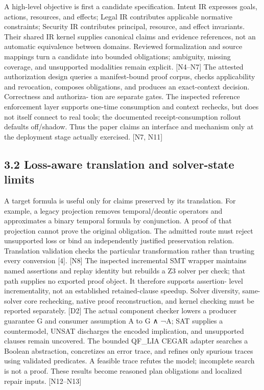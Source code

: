 A high-level objective is first a candidate specification. Intent IR expresses goals, actions, resources,
and effects; Legal IR contributes applicable normative constraints; Security IR contributes principal,
resource, and effect invariants. Their shared IR kernel supplies canonical claims and evidence
references, not an automatic equivalence between domains. Reviewed formalization and source
mappings turn a candidate into bounded obligations; ambiguity, missing coverage, and unsupported
modalities remain explicit. [N4–N7]
The attested authorization design queries a manifest-bound proof corpus, checks applicability and
revocation, composes obligations, and produces an exact-context decision. Correctness and authoriza-
tion are separate gates. The inspected reference enforcement layer supports one-time consumption
and context rechecks, but does not itself connect to real tools; the documented receipt-consumption
rollout defaults off/shadow. Thus the paper claims an interface and mechanism only at the deployment
stage actually exercised. [N7, N11]


\subsection*{3.2 Loss-aware translation and solver-state limits}

A target formula is useful only for claims preserved by its translation. For example, a legacy projection
removes temporal/deontic operators and approximates a binary temporal formula by conjunction.
A proof of that projection cannot prove the original obligation. The admitted route must reject
unsupported loss or bind an independently justified preservation relation. Translation validation
checks the particular transformation rather than trusting every conversion [4]. [N8]
The inspected incremental SMT wrapper maintains named assertions and replay identity but rebuilds
a Z3 solver per check; that path supplies no exported proof object. It therefore supports assertion-
level incrementality, not an established retained-clause speedup. Solver diversity, same-solver core
rechecking, native proof reconstruction, and kernel checking must be reported separately. [D2]
The actual component checker lowers a producer guarantee G and consumer assumption A to G ∧
¬A; SAT supplies a countermodel, UNSAT discharges the encoded implication, and unsupported
clauses remain uncovered. The bounded QF\_LIA CEGAR adapter searches a Boolean abstraction,
concretizes an error trace, and refines only spurious traces using validated predicates. A feasible trace
refutes the model; incomplete search is not a proof. These results become reasoned plan obligations
and localized repair inputs. [N12–N13]


